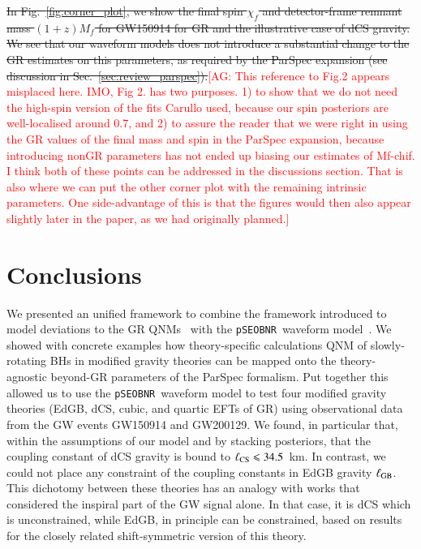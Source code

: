 \documentclass[twocolumn,
               prd,
               aps,
               superscriptaddress,
               tightenlines,
               nofootinbib,
               eqsecnum,
               amsfonts,
               amsmath,
               longbibliography]{revtex4-1}
\newcommand{\pSEOB}{\texttt{pSEOBNR}}
\newcommand{\agcomm}[1]{{\textcolor{red}{{[AG: #1]}} }}
\newcommand{\hs}[1]{{\textcolor{blue}{{[HS: #1]}} }}
\begin{document}
\sout{In Fig.~\ref{fig:corner_plot}, we show the final spin $\chi_f$ and
detector-frame remnant mass $(1 + z) M_f$ for GW150914 for GR and the
illustrative case of dCS gravity. We see that our waveform models does not
introduce a substantial change to the GR estimates on this parameters, as
required by the ParSpec expansion (see discussion in
Sec.~\ref{sec:review_parspec}).}\agcomm{This reference to Fig.2 appears misplaced here. IMO, Fig 2. has two purposes. 1) to show that we do not need the high-spin version of the fits Carullo used, because our spin posteriors are well-localised around 0.7, and 2) to assure the reader that we were right in using the GR values of the final mass and spin in the ParSpec expansion, because introducing nonGR parameters has not ended up biasing our estimates of Mf-chif.  I think both of these points can be addressed in the discussions section. That is also where we can put the other corner plot with the remaining intrinsic parameters. One side-advantage of this is that the figures would then also appear slightly later in the paper, as we had originally planned.}
%

\section{Conclusions}
\label{sec:conclusions}


We presented an unified framework to combine the framework introduced
to model deviations to the GR QNMs~\cite{Maselli:2019mjd} with the \pSEOB~waveform model~\cite{Brito:2018rfr,Ghosh:2021mrv}.
%
We showed with concrete examples how theory-specific calculations QNM of
slowly-rotating BHs in modified gravity theories can be mapped onto the
theory-agnostic beyond-GR parameters of the ParSpec formalism.
%
Put together this allowed us to use the \pSEOB~waveform model to test four
modified gravity theories (EdGB, dCS, cubic, and quartic EFTs of GR) using
observational data from the GW events GW150914 and GW200129.
%
We found, in particular that, within the assumptions of our model and by
stacking posteriors, that the coupling constant of dCS gravity is bound to
$\ell_{\rm CS} \leqslant 34.5$~km.
%
In contrast, we could not place any constraint of the coupling constants in EdGB gravity $\ell_{\rm GB}$.
%
This dichotomy between these theories has an analogy with works that considered
the inspiral part of the GW signal alone.
%
In that case, it is dCS which is unconstrained, while EdGB, in principle can be
constrained, based on results for the closely related shift-symmetric version
of this theory.
\end{document}
